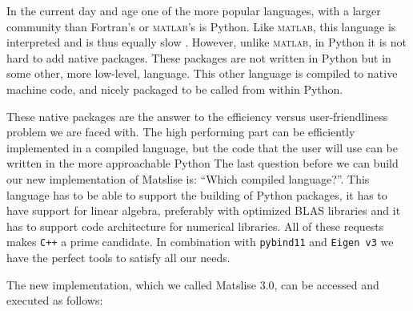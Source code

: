%


In the current day and age one of the more popular languages, with a larger community than Fortran's or \textsc{matlab}'s is Python.
Like \textsc{matlab}, this language is interpreted and is thus equally slow \cite{chaves_octave_2006,unpingco_comparative_2008}. However, unlike \textsc{matlab}, in Python it is not hard to add native packages.
These packages are not written in Python but in some other, more low-level,
language. This other language is compiled to native machine code, and nicely packaged to be called from within Python.

These native packages are the answer to the efficiency versus user-friendliness problem we are faced with. The high performing part can be efficiently
implemented in a compiled language, but the code that the user will use can be written in the more approachable Python The last
question before we can build our new implementation of Matslise is: ``Which compiled language?''. This language has to be able to support
the building of Python packages, it has to have support for linear algebra, preferably with optimized BLAS libraries and it has to
support code architecture for numerical libraries. All of these requests makes \texttt{C++} a prime candidate. In combination with \texttt{pybind11} \cite{jakob_pybind11_2017}
and \texttt{Eigen\ v3} \cite{guennebaud_eigen_2010} we have the perfect tools to satisfy all our needs.


The new implementation, which we called Matslise 3.0, can be accessed and executed as follows:

